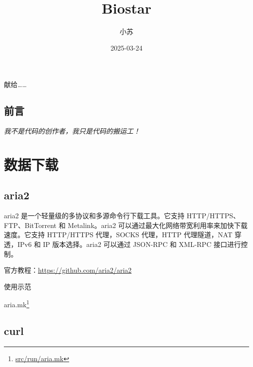 \documentclass[]{ctexbook}
\title{Biostar}
\author{小苏}
\date{2025-03-24}
\newenvironment{Shaded}{\begin{snugshade}}{\end{snugshade}}
\newcommand{\AttributeTok}[1]{\textcolor[rgb]{0.13,0.29,0.53}{#1}}
\newcommand{\FunctionTok}[1]{\textcolor[rgb]{0.13,0.29,0.53}{\textbf{#1}}}
\newcommand{\NormalTok}[1]{#1}
\newcommand{\OperatorTok}[1]{\textcolor[rgb]{0.81,0.36,0.00}{\textbf{#1}}}
\newcommand{\VariableTok}[1]{\textcolor[rgb]{0.00,0.00,0.00}{#1}}
\renewcommand{\href}[2]{#2\footnote{\url{#1}}}
\begin{document}
\maketitle

\thispagestyle{empty}

\begin{center}
献给……
\end{center}

\setlength{\abovedisplayskip}{-5pt}
\setlength{\abovedisplayshortskip}{-5pt}

{
\setcounter{tocdepth}{1}
\tableofcontents
}
\listoftables
\listoffigures
\chapter*{前言}\label{ux524dux8a00}


\emph{我不是代码的创作者，我只是代码的搬运工！}

\part{数据下载}\label{part-ux6570ux636eux4e0bux8f7d}

\chapter{aria2}\label{aria2}

aria2 是一个轻量级的多协议和多源命令行下载工具。它支持 HTTP/HTTPS、FTP、BitTorrent 和 Metalink。aria2 可以通过最大化网络带宽利用率来加快下载速度。它支持 HTTP/HTTPS 代理，SOCKS 代理，HTTP 代理隧道，NAT 穿透，IPv6 和 IP 版本选择。aria2 可以通过 JSON-RPC 和 XML-RPC 接口进行控制。

官方教程：\url{https://github.com/aria2/aria2}

使用示范

\begin{Shaded}
\end{Shaded}

\href{src/run/aria.mk}{aria.mk}

\chapter{curl}\label{curl}
\end{document}
